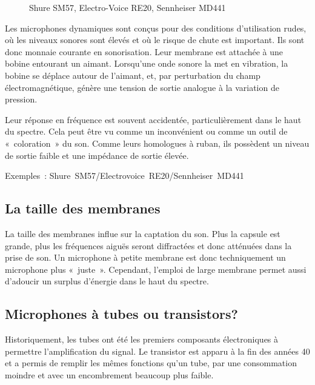 \documentclass[
  letterpaper,
  DIV=11,
  numbers=noendperiod]{scrreprt}
\begin{document}
\begin{figure}
\begin{minipage}[t]{0.33\linewidth}
{{}

}

\end{minipage}%

\caption{\label{fig-mic_dyn}Shure SM57, Electro-Voice RE20, Sennheiser
MD441}

\end{figure}

Les microphones dynamiques sont conçus pour des conditions d'utilisation
rudes, où les niveaux sonores sont élevés et où le risque de chute est
important. Ils sont donc monnaie courante en sonorisation. Leur membrane
est attachée à une bobine entourant un aimant. Lorsqu'une onde sonore la
met en vibration, la bobine se déplace autour de l'aimant, et, par
perturbation du champ électromagnétique, génère une tension de sortie
analogue à la variation de pression.

Leur réponse en fréquence est souvent accidentée, particulièrement dans
le haut du spectre. Cela peut être vu comme un inconvénient ou comme un
outil de «~coloration~» du son. Comme leurs homologues à ruban, ils
possèdent un niveau de sortie faible et une impédance de sortie élevée.

Exemples~: Shure~SM57/Electrovoice~RE20/Sennheiser~MD441

\hypertarget{la-taille-des-membranes}{%
\subsection{La taille des membranes}\label{la-taille-des-membranes}}

La taille des membranes influe sur la captation du son. Plus la capsule
est grande, plus les fréquences aiguës seront diffractées et donc
atténuées dans la prise de son. Un microphone à petite membrane est donc
techniquement un microphone plus «~juste~». Cependant, l'emploi de large
membrane permet aussi d'adoucir un surplus d'énergie dans le haut du
spectre.

\hypertarget{microphones-uxe0-tubes-ou-transistors}{%
\subsection{Microphones à tubes ou
transistors?}\label{microphones-uxe0-tubes-ou-transistors}}

Historiquement, les tubes ont été les premiers composants électroniques
à permettre l'amplification du signal. Le transistor est apparu à la fin
des années 40 et a permis de remplir les mêmes fonctions qu'un tube, par
une consommation moindre et avec un encombrement beaucoup plus faible.
\end{document}
